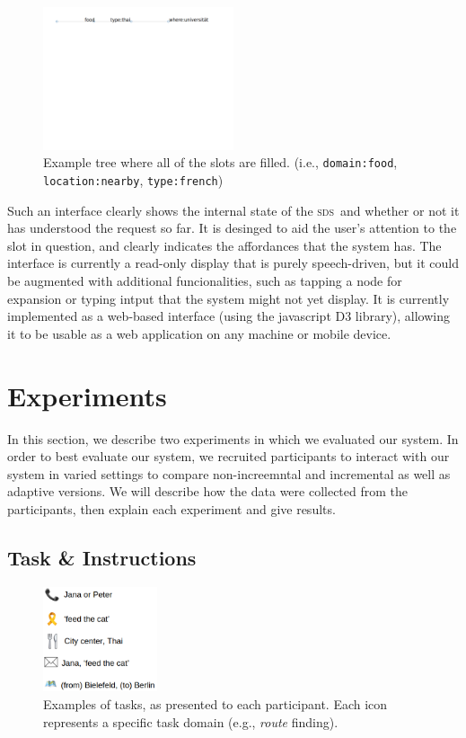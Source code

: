 \documentclass[11pt]{article}
\newcommand{\sds}[0]{\textsc{sds}}
\begin{document}
\begin{figure}[ht]
  \centering
      \includegraphics[width=0.5\textwidth]{figures/diatree-filled.pdf}	
      \caption{Example tree where all of the slots are filled. (i.e., \texttt{domain:food}, \texttt{location:nearby}, \texttt{type:french}) \label{fig:filled}}
\end{figure}

Such an interface clearly shows the internal state of the \sds\ and whether or not it has understood the request so far. It is desinged to aid the user's attention to the slot in question, and clearly indicates the affordances that the system has. The interface is currently a read-only display that is purely speech-driven, but it could be augmented with additional funcionalities, such as tapping a node for expansion or typing intput that the system might not yet display. It is currently implemented as a web-based interface (using the javascript D3 library), allowing it to be usable as a web application on any machine or mobile device. 

\section{Experiments}
\label{section:experiments}

In this section, we describe two experiments in which we evaluated our system. In order to best evaluate our system, we recruited participants to interact with our system in varied settings to compare non-increemntal and incremental as well as adaptive versions. We will describe how the data were collected from the participants, then explain each experiment and give results.

\subsection{Task \& Instructions} 


\begin{figure}
  \centering
      \includegraphics[width=0.3\textwidth]{figures/taskexample.png}	
      \caption{Examples of tasks, as presented to each participant. Each icon represents a specific task domain (e.g., \emph{route} finding).\label{fig:taskex}}
\end{figure}
\end{document}

